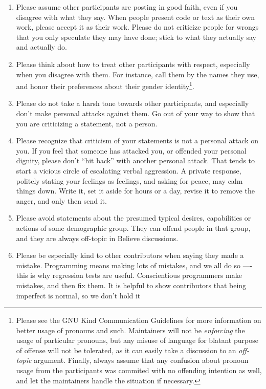 \documentclass[openright,a4paper,twoside,12pt]{memoir}
\begin{document}
\begin{enumerate}
\item Please assume other participants are posting in good faith, even if
you disagree with what they say. When people present code or text
as their own work, please accept it as their work. Please do not
criticize people for wrongs that you only speculate they may have
done; stick to what they actually say and actually do.
\item Please think about how to treat other participants with respect,
especially when you disagree with them. For instance, call them by
the names they use, and honor their preferences about their gender
identity\footnote{Please see the GNU Kind Communication Guidelines for more
information on better usage of pronouns and such. Maintainers will not
be \emph{enforcing} the usage of particular pronouns, but any misuse of
language for blatant purpose of offense will not be tolerated, as it
can easily take a discussion to an \emph{off-topic} argument. Finally, always
assume that any confusion about pronoun usage from the participants
was commited with no offending intention as well, and let the
maintainers handle the situation if necessary.}.
\item Please do not take a harsh tone towards other participants, and
especially don't make personal attacks against them. Go out of your
way to show that you are criticizing a statement, not a person.
\item Please recognize that criticism of your statements is not a personal
attack on you. If you feel that someone has attacked you, or
offended your personal dignity, please don't “hit back” with another
personal attack. That tends to start a vicious circle of escalating
verbal aggression. A private response, politely stating your
feelings as feelings, and asking for peace, may calm things
down. Write it, set it aside for hours or a day, revise it to remove
the anger, and only then send it.
\item Please avoid statements about the presumed typical desires,
capabilities or actions of some demographic group. They can offend
people in that group, and they are always off-topic in Believe
discussions.
\item Please be especially kind to other contributors when saying they
made a mistake. Programming means making lots of mistakes, and we
all do so —- this is why regression tests are useful. Conscientious
programmers make mistakes, and then fix them. It is helpful to show
contributors that being imperfect is normal, so we don't hold it

\end{enumerate}
\end{document}
